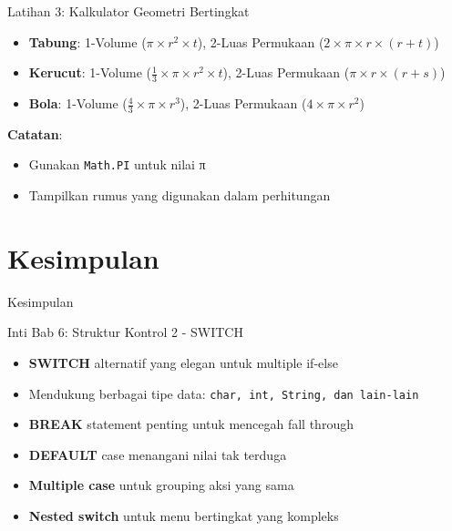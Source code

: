 \documentclass{beamer}
\begin{document}
\begin{frame}[fragile]{Latihan 3: Kalkulator Geometri Bertingkat}
  \begin{block}{}
    \begin{itemize}
      \item \textbf{Tabung}: 1-Volume ($\pi \times r^2 \times t$), 2-Luas Permukaan ($2 \times \pi \times r \times (r + t)$)
      \item \textbf{Kerucut}: 1-Volume ($\frac{1}{3} \times \pi \times r^2 \times t$), 2-Luas Permukaan ($\pi \times r \times (r + s)$)
      \item \textbf{Bola}: 1-Volume ($\frac{4}{3} \times \pi \times r^3$), 2-Luas Permukaan ($4 \times \pi \times r^2$)
    \end{itemize}
    
    \textbf{Catatan}: 
    \begin{itemize}
      \item Gunakan \texttt{Math.PI} untuk nilai π
      \item Tampilkan rumus yang digunakan dalam perhitungan
    \end{itemize}
  \end{block}
\end{frame}

\section{Kesimpulan}
\begin{frame}{Kesimpulan}
  \begin{alertblock}{Inti Bab 6: Struktur Kontrol 2 - SWITCH}
    \begin{itemize}
      \item \textbf{SWITCH} alternatif yang elegan untuk multiple if-else
      \item Mendukung berbagai tipe data: \texttt{char, int, String, dan lain-lain}
      \item \textbf{BREAK} statement penting untuk mencegah fall through
      \item \textbf{DEFAULT} case menangani nilai tak terduga
      \item \textbf{Multiple case} untuk grouping aksi yang sama
      \item \textbf{Nested switch} untuk menu bertingkat yang kompleks
    \end{itemize}
  \end{alertblock}
\end{frame}
\end{document}
